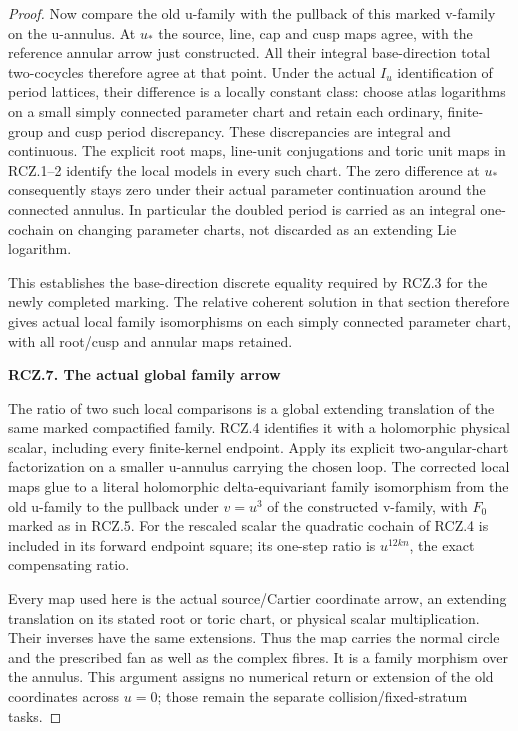 \begin{proof}
Now compare the old u-family with the pullback of this marked
v-family on the u-annulus. At \(u_*\) the source, line, cap and cusp
maps agree, with the reference annular arrow just constructed.
All their integral base-direction total two-cocycles therefore
agree at that point. Under the actual \(I_u\) identification of
period lattices, their difference is a locally constant class:
choose atlas logarithms on a small simply connected parameter
chart and retain each ordinary, finite-group and cusp period
discrepancy. These discrepancies are integral and continuous.
The explicit root maps, line-unit conjugations and toric unit
maps in RCZ.1--2 identify the local models in every such chart.
The zero difference at \(u_*\) consequently stays zero under their
actual parameter continuation around the connected annulus.
In particular the doubled period is carried as an integral
one-cochain on changing parameter charts, not discarded as an
extending Lie logarithm.

This establishes the base-direction discrete equality required
by RCZ.3 for the newly completed marking. The relative coherent
solution in that section therefore gives actual local family
isomorphisms on each simply connected parameter chart, with all
root/cusp and annular maps retained.

\par

\medskip\noindent\textbf{RCZ.7. The actual global family arrow}

\par\nobreak

The ratio of two such local comparisons is a global extending
translation of the same marked compactified family. RCZ.4
identifies it with a holomorphic physical scalar, including
every finite-kernel endpoint. Apply its explicit two-angular-chart
factorization on a smaller u-annulus carrying the chosen loop.
The corrected local maps glue to a literal holomorphic
delta-equivariant family isomorphism from the old u-family to
the pullback under \(v=u^3\) of the constructed v-family, with \(F_0\)
marked as in RCZ.5. For the rescaled scalar the quadratic
cochain of RCZ.4 is included in its forward endpoint square;
its one-step ratio is \(u^{12kn}\), the exact compensating ratio.

Every map used here is the actual source/Cartier coordinate
arrow, an extending translation on its stated root or toric
chart, or physical scalar multiplication. Their inverses have
the same extensions. Thus the map carries the normal circle
and the prescribed fan as well as the complex fibres. It is a
family morphism over the annulus. This argument assigns no
numerical return or extension of the old coordinates across
\(u=0\); those remain the separate collision/fixed-stratum tasks.


\end{proof}
